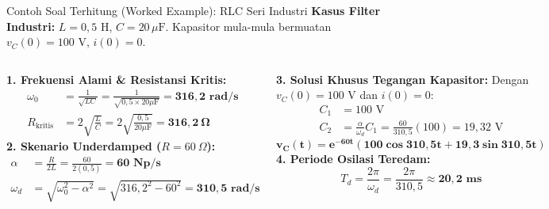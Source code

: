 \documentclass[aspectratio=169,10pt]{beamer}
\begin{document}
\begin{frame}{Contoh Soal Terhitung (Worked Example): RLC Seri Industri}
  \textbf{Kasus Filter Industri:} $L = 0{,}5\text{ H}$, $C = 20\,\mu\text{F}$. Kapasitor mula-mula bermuatan $v_C(0) = 100\text{ V}$, $i(0) = 0$.
  \vspace{0.1cm}

  \begin{columns}[t]
    \textbf{1. Frekuensi Alami \& Resistansi Kritis:}
    \begin{align*}
      \omega_0 &= \frac{1}{\sqrt{LC}} = \frac{1}{\sqrt{0{,}5 \times 20\mu\text{F}}} = \mathbf{316{,}2\text{ rad/s}} \\
      R_{\text{kritis}} &= 2\sqrt{\frac{L}{C}} = 2\sqrt{\frac{0{,}5}{20\mu\text{F}}} = \mathbf{316{,}2\ \Omega}
    \end{align*}
    \textbf{2. Skenario Underdamped ($R = 60\ \Omega$):}
    \begin{align*}
      \alpha &= \frac{R}{2L} = \frac{60}{2(0{,}5)} = \mathbf{60\text{ Np/s}} \\
      \omega_d &= \sqrt{\omega_0^2 - \alpha^2} = \sqrt{316{,}2^2 - 60^2} = \mathbf{310{,}5\text{ rad/s}}
    \end{align*}

    \textbf{3. Solusi Khusus Tegangan Kapasitor:}
    Dengan $v_C(0) = 100\text{ V}$ dan $i(0) = 0$:
    \begin{align*}
      C_1 &= 100\text{ V} \\
      C_2 &= \frac{\alpha}{\omega_d} C_1 = \frac{60}{310{,}5}(100) = 19{,}32\text{ V}
    \end{align*}
    \begin{equation*}
      \mathbf{v_C(t) = e^{-60t} (100 \cos 310{,}5t + 19{,}3 \sin 310{,}5t)}
    \end{equation*}
    \textbf{4. Periode Osilasi Teredam:}
    \begin{equation*}
      T_d = \frac{2\pi}{\omega_d} = \frac{2\pi}{310{,}5} \approx \mathbf{20{,}2\text{ ms}}
    \end{equation*}
  \end{columns}
\end{frame}
\end{document}
